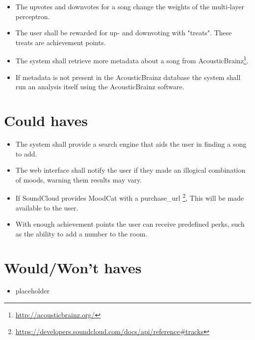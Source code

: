 \begin{itemize}
\item The upvotes and downvotes for a song change the weights of the multi-layer perceptron.

\item The user shall be rewarded for up- and downvoting with "treats". These treats are achievement points.

\item The system shall retrieve more metadata about a song from AcousticBrainz\footnote{\url{http://acousticbrainz.org/}}.

\item If metadata is not present in the AcousticBrainz database the system shall run an analysis itself using the AcousticBrainz software.

\end{itemize}

\section{Could haves}
\begin{itemize}
\item The system shall provide a search engine that aids the user in finding a song to add.

\item The web interface shall notify the user if they made an illogical combination of moods, warning them results may vary.

\item If SoundCloud provides MoodCat with a purchase\_url \footnote{\url{https://developers.soundcloud.com/docs/api/reference\#tracks}}, This will be made available to the user.

\item With enough achievement points the user can receive predefined perks, such as the ability to add a number to the room.


\end{itemize}

\section{Would/Won't haves}
\begin{itemize}
\item placeholder
\end{itemize}

